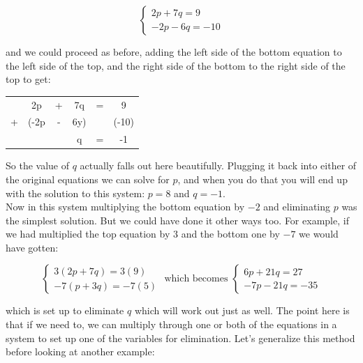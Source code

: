 $$\begin{cases} 2p+7q=9\\-2p-6q=-10 \end{cases}$$

and we could proceed as before, adding the left side of the bottom equation to the left side of the top, and the right side of the bottom to the right side of the top to get:

\begin{center}
	\begin{tabular}{c@{\,}c@{\,}c@{\,}c@{\,}c@{\,}c}
		& 2p & + & 7q & = & 9 \\
		+ & (-2p & - & 6y) & & (-10) \\
		\hline
		&  &  & q & = & -1 \\
	\end{tabular}
\end{center}

So the value of $q$ actually falls out here beautifully. Plugging it back into either of the original equations we can solve for $p$, and when you do that you will end up with the solution to this system:  $p = 8$ and $q = -1$.\\

Now in this system multiplying the bottom equation by $-2$ and eliminating $p$ was the simplest solution. But we could have done it other ways too. For example, if we had multiplied the top equation by $3$ and the bottom one by $-7$ we would have gotten:

\begin{equation*}
	\begin{cases}
		3(2p+7q)=3(9)\\
		-7(p+3q)=-7(5)
	\end{cases}
	\text{    which becomes    }
	\begin{cases}
		6p+21q=27\\
		-7p-21q=-35
	\end{cases}
\end{equation*}

which is set up to eliminate $q$ which will work out just as well. The point here is that if we need to, we can multiply through one or both of the equations in a system to set up one of the variables for elimination. Let’s generalize this method before looking at another example:

